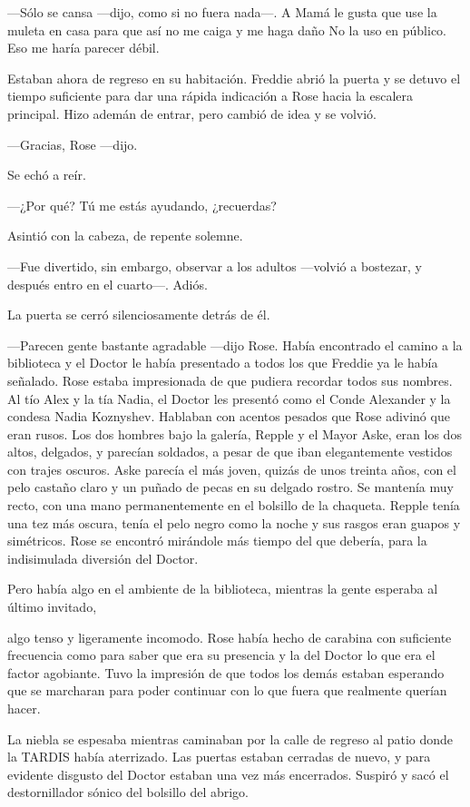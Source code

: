 {---Sólo se cansa ---dijo, como si no fuera nada---. A Mamá le gusta que
use la muleta en casa para que así no me caiga y me haga daño No la uso
en público. Eso me haría parecer débil.}

{Estaban ahora de regreso en su habitación. Freddie abrió la puerta y se
detuvo el tiempo suficiente para dar una rápida indicación a Rose hacia
la escalera principal. Hizo ademán de entrar, pero cambió de idea y se
volvió.}

{---Gracias, Rose ---dijo.}

{Se echó a reír.}

{---¿Por qué? Tú me estás ayudando, ¿recuerdas?}

{Asintió con la cabeza, de repente solemne.}

{---Fue divertido, sin embargo, observar a los adultos ---volvió a
bostezar, y después entro en el cuarto---. Adiós.}

{La puerta se cerró silenciosamente detrás de él.}

{---Parecen gente bastante agradable ---dijo Rose. Había encontrado el
camino a la biblioteca y el Doctor le había presentado a todos los que
Freddie ya le había señalado. Rose estaba impresionada de que pudiera
recordar todos sus nombres. Al tío Alex y la tía Nadia, el Doctor les
presentó como el Conde Alexander y la condesa Nadia Koznyshev. Hablaban
con acentos pesados }{que Rose adivinó que eran rusos. Los dos
hombres bajo la galería, Repple y el Mayor Aske, eran los dos altos,
delgados, y parecían soldados, a pesar de que iban elegantemente
vestidos con trajes oscuros. Aske parecía el más joven, quizás de unos
treinta años, con el pelo castaño claro y un puñado de pecas en su
delgado rostro. Se mantenía muy recto, con una mano permanentemente en
el bolsillo de la chaqueta. Repple tenía una tez más oscura, tenía el
pelo negro como la noche y sus rasgos eran guapos y simétricos. Rose se
encontró mirándole más tiempo del que debería, para la indisimulada
diversión del Doctor.}

{Pero había algo en el ambiente de la biblioteca, mientras la gente
esperaba al último invitado,}

{algo tenso y ligeramente incomodo. Rose había hecho de carabina con
suficiente frecuencia como para saber que era su presencia y la del
Doctor lo que era el factor agobiante. Tuvo la impresión de que todos
los demás estaban esperando que se marcharan para poder continuar con lo
que fuera que realmente querían hacer.}

{La niebla se espesaba mientras caminaban por la calle de regreso al
patio donde la TARDIS había aterrizado. Las puertas estaban cerradas de
nuevo, y para evidente disgusto del Doctor estaban una vez más
encerrados. Suspiró y sacó el destornillador sónico del bolsillo del
abrigo.}

